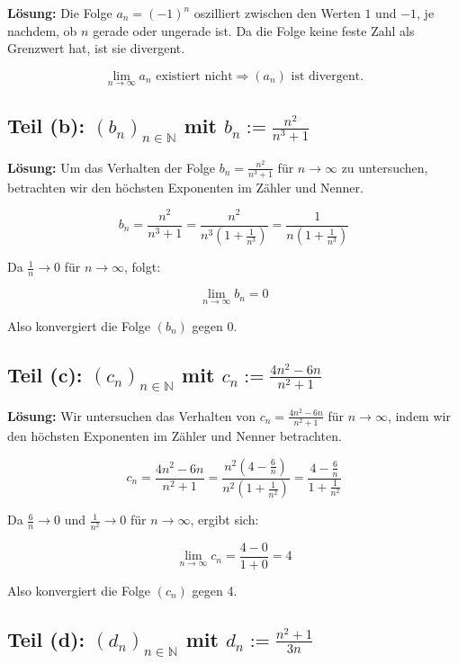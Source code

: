 \documentclass[11pt]{article}
\begin{document}
\textbf{Lösung:} Die Folge \( a_n = (-1)^n \) oszilliert zwischen den Werten \( 1 \) und \( -1 \), je nachdem, ob \( n \) gerade oder ungerade ist. Da die Folge keine feste Zahl als Grenzwert hat, ist sie divergent.

\[
\lim_{n \to \infty} a_n \text{ existiert nicht} \Rightarrow (a_n) \text{ ist divergent.}
\]

\subsection*{Teil (b): \( (b_n)_{n \in \mathbb{N}} \) mit \( b_n := \frac{n^2}{n^3 + 1} \)}

\textbf{Lösung:} Um das Verhalten der Folge \( b_n = \frac{n^2}{n^3 + 1} \) für \( n \to \infty \) zu untersuchen, betrachten wir den höchsten Exponenten im Zähler und Nenner.

\[
b_n = \frac{n^2}{n^3 + 1} = \frac{n^2}{n^3 \left(1 + \frac{1}{n^3}\right)} = \frac{1}{n \left(1 + \frac{1}{n^3}\right)}
\]

Da \( \frac{1}{n} \to 0 \) für \( n \to \infty \), folgt:

\[
\lim_{n \to \infty} b_n = 0
\]

Also konvergiert die Folge \( (b_n) \) gegen 0.

\subsection*{Teil (c): \( (c_n)_{n \in \mathbb{N}} \) mit \( c_n := \frac{4n^2 - 6n}{n^2 + 1} \)}

\textbf{Lösung:} Wir untersuchen das Verhalten von \( c_n = \frac{4n^2 - 6n}{n^2 + 1} \) für \( n \to \infty \), indem wir den höchsten Exponenten im Zähler und Nenner betrachten.

\[
c_n = \frac{4n^2 - 6n}{n^2 + 1} = \frac{n^2 (4 - \frac{6}{n})}{n^2 (1 + \frac{1}{n^2})} = \frac{4 - \frac{6}{n}}{1 + \frac{1}{n^2}}
\]

Da \( \frac{6}{n} \to 0 \) und \( \frac{1}{n^2} \to 0 \) für \( n \to \infty \), ergibt sich:

\[
\lim_{n \to \infty} c_n = \frac{4 - 0}{1 + 0} = 4
\]

Also konvergiert die Folge \( (c_n) \) gegen 4.

\subsection*{Teil (d): \( (d_n)_{n \in \mathbb{N}} \) mit \( d_n := \frac{n^2 + 1}{3n} \)}
\end{document}
